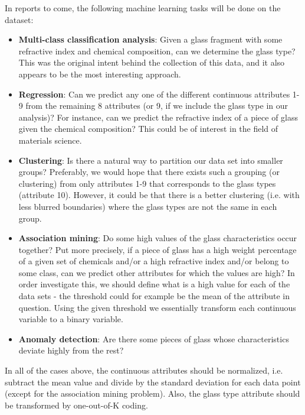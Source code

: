 
In reports to come, the following machine learning tasks will be done on the dataset: %

\begin{itemize}
\item \textbf{Multi-class classification analysis}: Given a glass fragment with some refractive index and chemical composition, can we determine the glass type? This was the original intent behind the collection of this data, and it also appears to be the most interesting approach.
\item \textbf{Regression}: Can we predict any one of the different continuous attributes 1-9 from the remaining 8 attributes (or 9, if we include the glass type in our analysis)? For instance, can we predict the refractive index of a piece of glass given the chemical composition? This could be of interest in the field of materials science.
\item \textbf{Clustering}: Is there a natural way to partition our data set into smaller groups? Preferably, we would hope that there exists such a grouping (or clustering) from only attributes 1-9 that corresponds to the glass types (attribute 10). However, it could be that there is a better clustering (i.e. with less blurred boundaries) where the glass types are not the same in each group.
\item \textbf{Association mining}: Do some high values of the glass characteristics occur together? Put more precisely, if a piece of glass has a high weight percentage of a given set of chemicals and/or a high refractive index and/or belong to some class, can we predict other attributes for which the values are high? In order investigate this, we should define what is a high value for each of the data sets  - the threshold could for example be the mean of the attribute in question. Using the given threshold we essentially transform each continuous variable to a binary variable.
\item \textbf{Anomaly detection}: Are there some pieces of glass whose characteristics deviate highly from the rest?
\end{itemize}

In all of the cases above, the continuous attributes should be normalized, i.e. subtract the mean value and divide by the standard deviation for each data point (except for the association mining problem). Also, the glass type attribute should be transformed by one-out-of-K coding. 